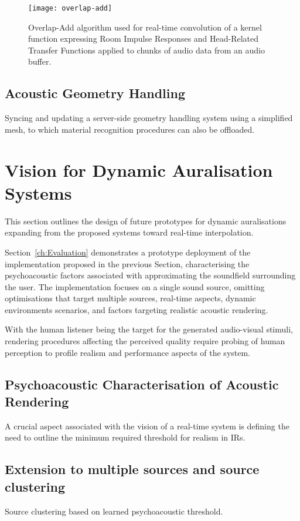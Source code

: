 \begin{figure}[htb]
    \centering
    \texttt{[image: overlap-add]}
    \caption{Overlap-Add algorithm used for real-time convolution of a kernel function expressing Room Impulse Responses and Head-Related Transfer Functions applied to chunks of audio data from an audio buffer.}
\label{fig:overlap-add}
\end{figure}

\subsection{Acoustic Geometry Handling}
Syncing and updating a server-side geometry handling system using a simplified mesh, to which material recognition procedures can also be offloaded.

\section{Vision for Dynamic Auralisation Systems}
This section outlines the design of future prototypes for dynamic auralisations expanding from the proposed systems toward real-time interpolation.\par
Section~\ref{ch:Evaluation} demonstrates a prototype deployment of the implementation proposed in the previous Section, characterising the psychoacoustic factors associated with approximating the soundfield surrounding the user. The implementation focuses on a single sound source, omitting optimisations that target multiple sources, real-time aspects, dynamic environments scenarios, and factors targeting realistic acoustic rendering.\par
With the human listener being the target for the generated audio-visual stimuli, rendering procedures affecting the perceived quality require probing of human perception to profile realism and performance aspects of the system. 

\subsection{Psychoacoustic Characterisation of Acoustic Rendering}
A crucial aspect associated with the vision of a real-time system is defining the need to outline the minimum required threshold for realism in IRs.

\subsection{Extension to multiple sources and source clustering}
Source clustering based on learned psychoacoustic threshold.


